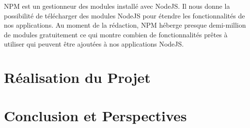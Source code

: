 \documentclass[a4paper,11pt,oneside]{report}
\begin{document}
NPM est un gestionneur des modules installé avec NodeJS. Il nous donne la possibilité de télécharger des modules NodeJS pour étendre les fonctionnalités de nos applications. Au moment de la rédaction, NPM héberge presque demi-million de modules gratuitement ce qui montre combien de fonctionnalités prêtes à utiliser qui peuvent être ajoutées à nos applications NodeJS.

\newpage

\chapter{Réalisation du Projet}

\newpage

\chapter*{Conclusion et Perspectives}

\newpage

\renewcommand{\appendixtocname}{Annexes}
\end{document}
